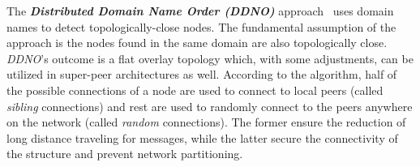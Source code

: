
%
%
%

The \textbf{\emph{Distributed Domain Name Order (DDNO)}} approach~\cite{Z-YK2005}
uses domain names to detect topologically-close nodes.
The fundamental assumption of the approach is the nodes found in 
the same domain are also topologically close.
\emph{DDNO}'s outcome is a flat overlay topology which, with some adjustments, 
can be utilized in super-peer architectures as well. According to the algorithm,
half of the possible connections of a node are used to connect to local peers
(called \emph{sibling} connections) and rest are used to randomly
connect to the peers anywhere on the network (called \emph{random} connections).
The former ensure the reduction of long distance traveling for messages, while
the latter secure the connectivity of the structure and prevent network
partitioning.

